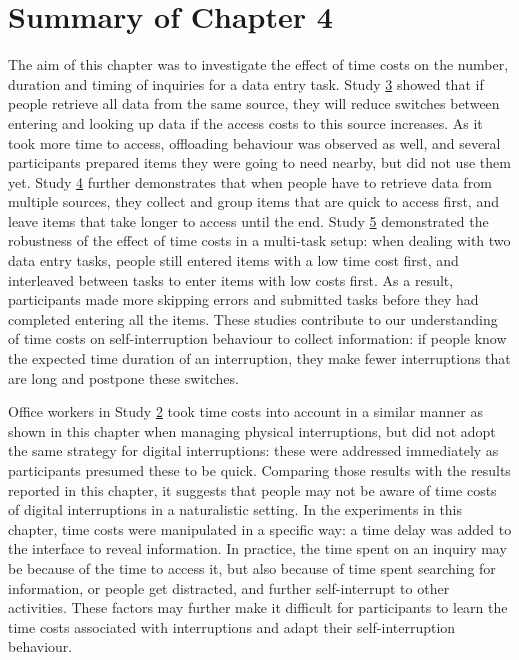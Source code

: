 \section{Summary of Chapter 4}
The aim of this chapter was to investigate the effect of time costs on the number, duration and timing of inquiries for a data entry task. Study \hyperref[st:Study3]{3} showed that if people retrieve all data from the same source, they will reduce switches between entering and looking up data if the access costs to this source increases. As it took more time to access, offloading behaviour was observed as well, and several participants prepared items they were going to need nearby, but did not use them yet. Study \hyperref[st:Study4]{4} further demonstrates that when people have to retrieve data from multiple sources, they collect and group items that are quick to access first, and leave items that take longer to access until the end. Study \hyperref[st:Study5]{5} demonstrated the robustness of the effect of time costs in a multi-task setup: when dealing with two data entry tasks, people still entered items with a low time cost first, and interleaved between tasks to enter items with low costs first. As a result, participants made more skipping errors and submitted tasks before they had completed entering all the items. These studies contribute to our understanding of time costs on self-interruption behaviour to collect information: if people know the expected time duration of an interruption, they make fewer interruptions that are long and postpone these switches. 

Office workers in Study \hyperref[st:Study2]{2} took time costs into account in a similar manner as shown in this chapter when managing physical interruptions, but did not adopt the same strategy for digital interruptions: these were addressed immediately as participants presumed these to be quick. Comparing those results with the results reported in this chapter, it suggests that people may not be aware of time costs of digital interruptions in a naturalistic setting. In the experiments in this chapter, time costs were manipulated in a specific way: a time delay was added to the interface to reveal information. In practice, the time spent on an inquiry may be because of the time to access it, but also because of time spent searching for information, or people get distracted, and further self-interrupt to other activities. These factors may further make it difficult for participants to learn the time costs associated with interruptions and adapt their self-interruption behaviour. 

